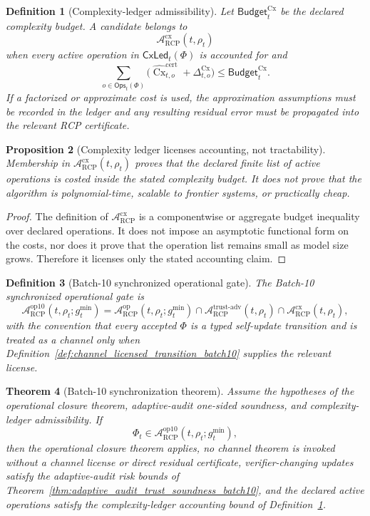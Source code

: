 \documentclass[11pt]{article}
\newtheorem{theorem}{Theorem}[section]
\newtheorem{proposition}[theorem]{Proposition}
\newtheorem{definition}[theorem]{Definition}
\newcommand{\Acal}{\mathcal{A}}
\newcommand{\1}{\mathbf{1}}
\newcommand{\RCP}{\mathrm{RCP}}
\providecommand{\Cx}{\operatorname{Cx}}
\begin{document}
\begin{definition}[Complexity-ledger admissibility]
\label{def:complexity_ledger_admissibility_batch10}
Let \(\mathsf{Budget}_t^{\Cx}\) be the declared complexity budget.  A candidate belongs to
\[
\Acal_{\RCP}^{\mathrm{cx}}(t,\rho_t)
\]
when every active operation in \(\mathsf{CxLed}_t(\Phi)\) is accounted for and
\[
\sum_{o\in\mathsf{Ops}_t(\Phi)}
\bigl(\widehat{\Cx}_{t,o}^{\mathrm{cert}}+\Delta_{t,o}^{\Cx}\bigr)
\le
\mathsf{Budget}_t^{\Cx}.
\]
If a factorized or approximate cost is used, the approximation assumptions must be recorded in the ledger and any resulting residual error must be propagated into the relevant RCP certificate.
\end{definition}

\begin{proposition}[Complexity ledger licenses accounting, not tractability]
\label{prop:complexity_ledger_not_tractability_batch10}
Membership in \(\Acal_{\RCP}^{\mathrm{cx}}(t,\rho_t)\) proves that the declared finite list of active operations is costed inside the stated complexity budget.  It does not prove that the algorithm is polynomial-time, scalable to frontier systems, or practically cheap.
\end{proposition}

\begin{proof}
The definition of \(\Acal_{\RCP}^{\mathrm{cx}}\) is a componentwise or aggregate budget inequality over declared operations.  It does not impose an asymptotic functional form on the costs, nor does it prove that the operation list remains small as model size grows.  Therefore it licenses only the stated accounting claim.
\end{proof}

\begin{definition}[Batch-10 synchronized operational gate]
\label{def:batch10_synchronized_operational_gate}
The Batch-10 synchronized operational gate is
\[
\Acal_{\RCP}^{\mathrm{op10}}(t,\rho_t;g_t^{\min})
=
\Acal_{\RCP}^{\mathrm{op}}(t,\rho_t;g_t^{\min})
\cap
\Acal_{\RCP}^{\mathrm{trust\mbox{-}adv}}(t,\rho_t)
\cap
\Acal_{\RCP}^{\mathrm{cx}}(t,\rho_t),
\]
with the convention that every accepted \(\Phi\) is a typed self-update transition and is treated as a channel only when Definition~\ref{def:channel_licensed_transition_batch10} supplies the relevant license.
\end{definition}

\begin{theorem}[Batch-10 synchronization theorem]
\label{thm:batch10_synchronization_theorem}
Assume the hypotheses of the operational closure theorem, adaptive-audit one-sided soundness, and complexity-ledger admissibility.  If
\[
\Phi_t\in\Acal_{\RCP}^{\mathrm{op10}}(t,\rho_t;g_t^{\min}),
\]
then the operational closure theorem applies, no channel theorem is invoked without a channel license or direct residual certificate, verifier-changing updates satisfy the adaptive-audit risk bounds of Theorem~\ref{thm:adaptive_audit_trust_soundness_batch10}, and the declared active operations satisfy the complexity-ledger accounting bound of Definition~\ref{def:complexity_ledger_admissibility_batch10}.
\end{theorem}
\end{document}

